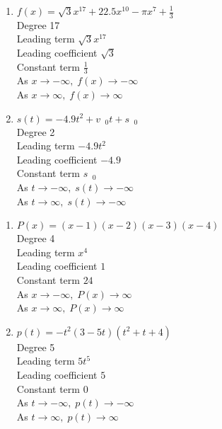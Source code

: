 \documentclass{ximera}
\begin{document}
\begin{enumerate}
\setcounter{enumi}{\value{HW}}

\item $f(x) = \sqrt{3}x^{17} + 22.5x^{10} - \pi x^{7} + \frac{1}{3}$\\
Degree 17 \\
Leading term $\sqrt{3}x^{17}$\\
Leading coefficient $\sqrt{3}$\\
Constant term $\frac{1}{3}$\\
As $x \rightarrow -\infty, \; f(x) \rightarrow -\infty$\\
As $x \rightarrow \infty, \; f(x) \rightarrow \infty$\\


\item $s(t) = -4.9t^{2} + v_{\mbox{ $0$}}t + s_{\mbox{ $0$}}$\\
Degree 2 \\
Leading term $-4.9t^{2}$\\
Leading coefficient $-4.9$\\
Constant term $s_{\mbox{ $0$}}$\\
As $t \rightarrow -\infty, \; s(t) \rightarrow -\infty$\\
As $t \rightarrow \infty, \; s(t) \rightarrow -\infty$\\


\setcounter{HW}{\value{enumi}}
\end{enumerate}

\begin{enumerate}
\setcounter{enumi}{\value{HW}}


\item $P(x) = (x - 1)(x - 2)(x - 3)(x - 4)$\\
Degree 4 \\
Leading term $x^{4}$\\
Leading coefficient $1$\\
Constant term $24$\\
As $x \rightarrow -\infty, \; P(x) \rightarrow \infty$\\
As $x \rightarrow \infty, \; P(x) \rightarrow \infty$\\

\item $p(t) = -t^2(3 - 5t)(t^{2} + t + 4)$\\
Degree 5 \\
Leading term $5t^{5}$\\
Leading coefficient $5$\\
Constant term $0$\\
As $t \rightarrow -\infty, \; p(t) \rightarrow -\infty$\\
As $t \rightarrow \infty, \; p(t) \rightarrow \infty$\\

\setcounter{HW}{\value{enumi}}
\end{enumerate}
\end{document}

